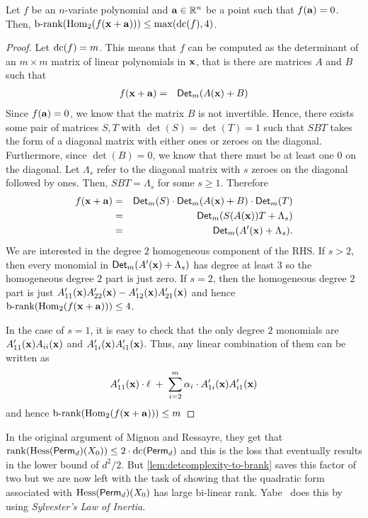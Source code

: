 \begin{lemma}\label{lem:detcomplexity-to-brank} Let $f$ be an $n$-variate polynomial and $\mathbf{a} \in \mathbb{R}^n$ be a point such that $f(\mathbf{a}) = 0$. Then, $\text{b-rank}(\mathrm{Hom}_2(f(\mathbf{x} + \mathbf{a}))) \leq \max(\mathrm{dc}(f),4)$. 
\end{lemma}
\begin{proof}
Let $\mathrm{dc}(f) = m$. This means that $f$ can be computed as the determinant of an $m\times m$ matrix of linear polynomials in $\mathbf{x}$, that is there are matrices $A$ and $B$ such that  
\begin{eqnarray*}
f(\mathbf{x} + \mathbf{a}) & = & \mathsf{Det}_m(A(\mathbf{x}) + B)
\end{eqnarray*}
Since $f(\mathbf{a}) = 0$, we know that the matrix $B$ is not invertible. Hence, there exists some pair of matrices $S, T$ with $\det(S) = \det(T) = 1$ such that $S B T$ takes the form of a diagonal matrix with either ones or zeroes on the diagonal. Furthermore, since $\det(B) = 0$, we know that there must be at least one $0$ on the diagonal. Let $\Lambda_s$ refer to the diagonal matrix with $s$ zeroes on the diagonal followed by ones. Then, $S B T = \Lambda_s$ for some $s \geq 1$. Therefore 
\begin{eqnarray*}
f(\mathbf{x} + \mathbf{a}) & = & \mathsf{Det}_m(S) \cdot \mathsf{Det}_m(A(\mathbf{x}) + B) \cdot \mathsf{Det}_m(T)\\
 & = & \mathsf{Det}_m( S (A(\mathbf{x})) T + \Lambda_s)\\
 & = & \mathsf{Det}_m( A'(\mathbf{x}) + \Lambda_s).
\end{eqnarray*}
We are interested in the degree $2$ homogeneous component of the RHS. If $s > 2$, then every monomial in $\mathsf{Det}_m(A'(\mathbf{x}) + \Lambda_s)$ has degree at least $3$ so the homogeneous degree $2$ part is just zero. If $s = 2$, then the homogeneous degree $2$ part is just $A'_{11}(\mathbf{x}) A'_{22}(\mathbf{x}) - A'_{12}(\mathbf{x}) A'_{21}(\mathbf{x})$ and hence $\text{b-rank}(\mathrm{Hom}_2(f(\mathbf{x} + \mathbf{a})))\leq 4$. 

In the case of $s = 1$, it is easy to check that the only degree $2$ monomials are $A_{11}'(\mathbf{x}) A_{ii}(\mathbf{x})$ and $A_{1i}'(\mathbf{x}) A_{i1}'(\mathbf{x})$. Thus, any linear combination of them can be written as
\[
A_{11}'(\mathbf{x}) \cdot \ell  \;+\;  \sum_{i=2}^m \alpha_i \cdot A_{1i}'(\mathbf{x})A_{i1}'(\mathbf{x})
\]
and hence $\text{b-rank}(\mathrm{Hom}_2(f(\mathbf{x} + \mathbf{a}))) \leq m$
\end{proof}

In the original argument of Mignon and Ressayre, they get that $\mathrm{rank}(\mathrm{Hess}(\mathsf{Perm}_d)(X_0)) \leq 2 \cdot \mathrm{dc}(\mathsf{Perm}_d)$ and this is the loss that eventually results in the lower bound of $d^2/2$. But \autoref{lem:detcomplexity-to-brank} saves this factor of two but we are now left with the task of showing that the quadratic form associated with $\mathrm{Hess}(\mathsf{Perm}_d)(X_0)$ has large bi-linear rank. Yabe~\cite{Yabe15} does this by using \emph{Sylvester's Law of Inertia}.

